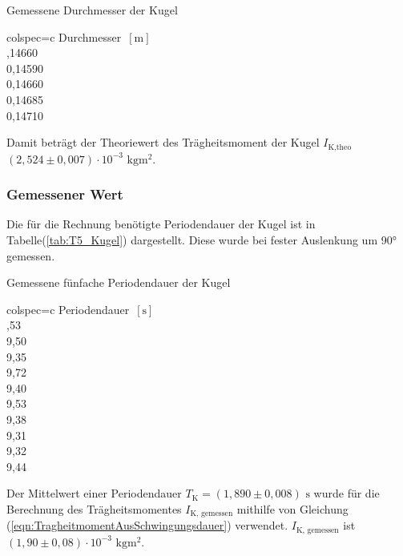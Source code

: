     \begin{table}[H]
      \centering 
      \caption{Gemessene Durchmesser der Kugel}
      \label{tab:Durchmesser_Kugel}
      \begin{tblr}{colspec={c}}
          \toprule
          Durchmesser $\,[\unit{\meter}]$ \\
          ,14660 \\
          0,14590 \\
          0,14660 \\
          0,14685 \\
          0,14710 \\
          \bottomrule
      \end{tblr}
    \end{table}
    Damit beträgt der Theoriewert des Trägheitsmoment der Kugel $I_{\text{K,theo}}$ $(2,524 \pm 0,007) \cdot 10^{-3} \,\,\unit{\kilo\gram\meter\squared}$.

    \subsubsection{Gemessener Wert}
    Die für die Rechnung benötigte Periodendauer der Kugel ist in Tabelle(\ref{tab:T5_Kugel}) dargestellt. 
    Diese wurde bei fester Auslenkung um 90° gemessen.
    \begin{table}[H]
      \centering 
      \caption{Gemessene fünfache Periodendauer der Kugel}
      \label{tab:T5_Kugel}
      \begin{tblr}{colspec={c}}
          \toprule
          Periodendauer $\,[\unit{\second}]$ \\
          ,53 \\
          9,50 \\
          9,35 \\
          9,72 \\
          9,40 \\
          9,53 \\
          9,38 \\
          9,31 \\
          9,32 \\
          9,44 \\
          \bottomrule
      \end{tblr}
    \end{table}
    Der Mittelwert einer Periodendauer $T_{\text{K}} = (1,890 \pm 0,008) \,\,\unit{\second}$ wurde für die Berechnung des 
    Trägheitsmomentes $I_{\text{K, gemessen}}$ mithilfe von Gleichung (\ref{eqn:TragheitmomentAusSchwingungsdauer}) verwendet. 
    $I_{\text{K, gemessen}}$ ist $(1,90 \pm 0,08) \cdot 10^{-3} \,\,\unit{\kilo\gram\meter\squared}$.

